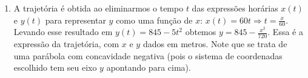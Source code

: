 \begin{question}
\begin{solution}
\begin{enumerate}
				\item A trajetória é obtida ao eliminarmos o tempo $t$ das expressões horárias $x(t)$ e $y(t)$ para representar $y$ como uma função de $x$: $x(t) = 60 t \Rightarrow t = \frac{x}{60}$.
				Levando esse resultado em $y(t) = 845 - 5t^2$ obtemos $y = 845 - \frac{x^2}{720}$.
				Essa é a expressão da trajetória, com $x$ e $y$ dados em metros.
				Note que se trata de uma parábola com concavidade negativa (pois o sistema de coordenadas escolhido tem seu eixo $y$ apontando para cima).
			\end{enumerate}
		\end{solution}
	\end{question}